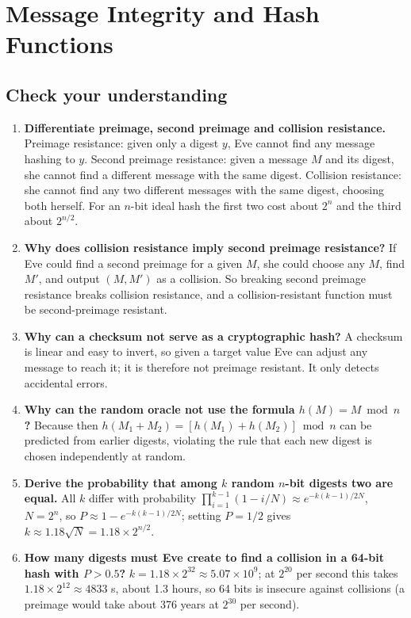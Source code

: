 \section{Message Integrity and Hash Functions}\label{q:19_integrity}

\subsection*{Check your understanding}
\begin{enumerate}[leftmargin=*]
  \item \textbf{Differentiate preimage, second preimage and collision resistance.} Preimage resistance: given only a digest $y$, Eve cannot find any message hashing to $y$. Second preimage resistance: given a message $M$ and its digest, she cannot find a different message with the same digest. Collision resistance: she cannot find any two different messages with the same digest, choosing both herself. For an $n$-bit ideal hash the first two cost about $2^n$ and the third about $2^{n/2}$.
  \item \textbf{Why does collision resistance imply second preimage resistance?} If Eve could find a second preimage for a given $M$, she could choose any $M$, find $M'$, and output $(M, M')$ as a collision. So breaking second preimage resistance breaks collision resistance, and a collision-resistant function must be second-preimage resistant.
  \item \textbf{Why can a checksum not serve as a cryptographic hash?} A checksum is linear and easy to invert, so given a target value Eve can adjust any message to reach it; it is therefore not preimage resistant. It only detects accidental errors.
  \item \textbf{Why can the random oracle not use the formula $h(M) = M \bmod n$?} Because then $h(M_1 + M_2) = [h(M_1) + h(M_2)] \bmod n$ can be predicted from earlier digests, violating the rule that each new digest is chosen independently at random.
  \item \textbf{Derive the probability that among $k$ random $n$-bit digests two are equal.} All $k$ differ with probability $\prod_{i=1}^{k-1}(1 - i/N) \approx e^{-k(k-1)/2N}$, $N = 2^n$, so $P \approx 1 - e^{-k(k-1)/2N}$; setting $P = 1/2$ gives $k \approx 1.18\sqrt N = 1.18 \times 2^{n/2}$.
  \item \textbf{How many digests must Eve create to find a collision in a 64-bit hash with $P > 0.5$?} $k = 1.18 \times 2^{32} \approx 5.07 \times 10^9$; at $2^{20}$ per second this takes $1.18 \times 2^{12} \approx 4833$ s, about 1.3 hours, so 64 bits is insecure against collisions (a preimage would take about 376 years at $2^{30}$ per second).

\end{enumerate}
